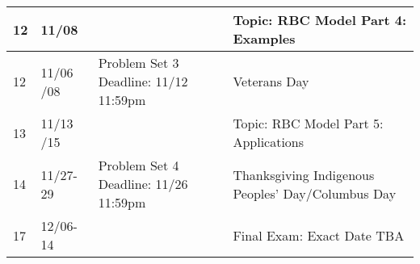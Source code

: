 \documentclass[12pt]{article}
\begin{document}
\begin{tabular}{|p{\bb}|p{\qq}|p{\rr}|p{\pp}|}
    \hline
        12
        &
        11/08
        &
        &
        Topic: RBC Model Part 4: Examples
    \\
    \hline
        12
        &
        11/06
        \newline
        11/08
        &
        Problem Set 3
        \newline
        Deadline: 11/12 11:59pm
        &
        Veterans Day
    \\
    \hline
        13
        &
        11/13
        \newline
        11/15
        &
        &
        Topic: RBC Model Part 5: Applications
    \\
    \hline
        14
        &
        11/27-29
        &
        Problem Set 4
        \newline
        Deadline: 11/26 11:59pm
        &
        Thanksgiving
        \newline
        Indigenous Peoples' Day/Columbus Day
    \\
    \hline
        17
        &
        12/06-14
        &
        &
        Final Exam: Exact Date TBA
    \\
    \hline
\end{tabular}
\end{document}
